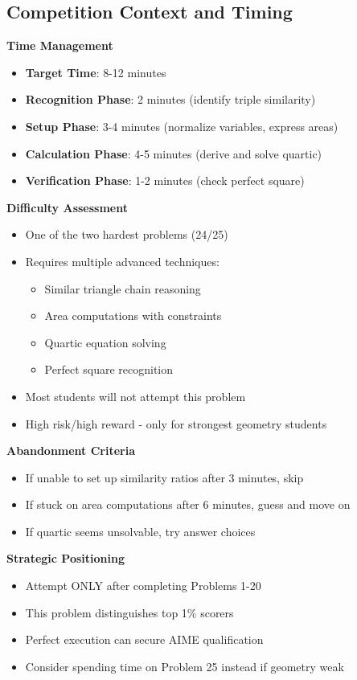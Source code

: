 \documentclass[]{article}
\begin{document}
\begin{competitionbox}
\subsection*{Competition Context and Timing}

\textbf{Time Management}
\begin{itemize}[leftmargin=*]
    \item \textbf{Target Time}: 8-12 minutes
    \item \textbf{Recognition Phase}: 2 minutes (identify triple similarity)
    \item \textbf{Setup Phase}: 3-4 minutes (normalize variables, express areas)
    \item \textbf{Calculation Phase}: 4-5 minutes (derive and solve quartic)
    \item \textbf{Verification Phase}: 1-2 minutes (check perfect square)
\end{itemize}

\textbf{Difficulty Assessment}
\begin{itemize}[leftmargin=*]
    \item One of the two hardest problems (24/25)
    \item Requires multiple advanced techniques:
    \begin{itemize}
        \item Similar triangle chain reasoning
        \item Area computations with constraints
        \item Quartic equation solving
        \item Perfect square recognition
    \end{itemize}
    \item Most students will not attempt this problem
    \item High risk/high reward - only for strongest geometry students
\end{itemize}

\textbf{Abandonment Criteria}
\begin{itemize}[leftmargin=*]
    \item If unable to set up similarity ratios after 3 minutes, skip
    \item If stuck on area computations after 6 minutes, guess and move on
    \item If quartic seems unsolvable, try answer choices
\end{itemize}

\textbf{Strategic Positioning}
\begin{itemize}[leftmargin=*]
    \item Attempt ONLY after completing Problems 1-20
    \item This problem distinguishes top 1\% scorers
    \item Perfect execution can secure AIME qualification
    \item Consider spending time on Problem 25 instead if geometry weak
\end{itemize}
\end{competitionbox}
\end{document}
